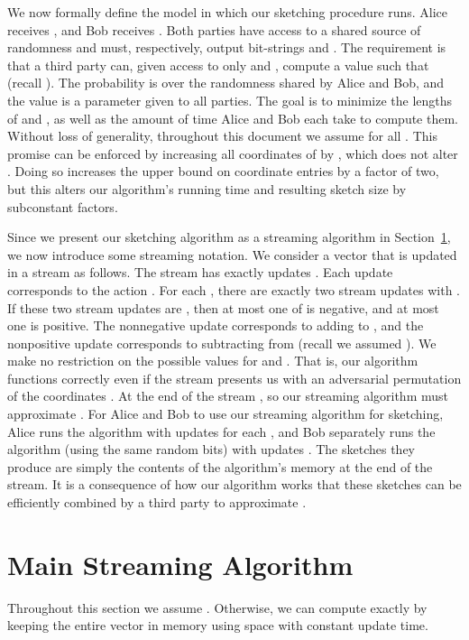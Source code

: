 \documentclass[letterpaper,11pt]{article}
\newcommand{\SectionName}[1]{\label{sec:#1}}
\newcommand{\Section}[1]{Section~\ref{sec:#1}}
\begin{document}
We now formally define the model in which our sketching procedure
runs. Alice receives , and Bob receives
. Both parties have access to a shared source of
randomness and must, respectively, output bit-strings  and
.
The requirement is that a third party can, given access to only 
and , compute a value  such that  (recall ). The probability is over the randomness shared by Alice and
Bob, and the value  is a parameter given to all
parties. The goal is to minimize the lengths of  and , as
well
as the amount of time Alice and Bob each take to compute them.
Without loss of generality, throughout this
document we assume  for all .  This promise can be
enforced by increasing all coordinates of  by , which
does not alter .  Doing so increases the upper bound on
coordinate entries by a factor of two, but this alters our algorithm's
running time and resulting sketch size
by subconstant factors.

Since we present our sketching algorithm as a streaming algorithm
in \Section{body}, we now introduce some streaming notation.
We consider a vector  that is updated in a
stream as follows. The stream has
exactly  updates . Each update  corresponds to the
action .
For each , there are exactly two
stream updates  with .  If these two stream updates are
, then at most
one of  is negative, and at most one is positive. The
nonnegative update corresponds to adding  to , and the
nonpositive update corresponds to subtracting  from  (recall
we assumed ). We make no restriction on the
possible values for  and . That is, our algorithm
functions correctly even if the stream
presents us with an adversarial permutation of the  coordinates
. At the end of the stream , so our streaming algorithm must
approximate . For Alice and Bob to use our streaming
algorithm for sketching, Alice runs the algorithm with updates
 for each , and Bob separately runs the
algorithm (using the same random bits) with updates . The
sketches they produce are simply the contents of the algorithm's
memory at the end of the stream.  It is a consequence of how our
algorithm works that these sketches can be
efficiently combined by a third party to approximate .

\section{Main Streaming Algorithm}\SectionName{body}
Throughout this section we assume .  Otherwise, we
can compute  exactly by keeping the entire vector in memory
using  space with constant update
time.
\end{document}
